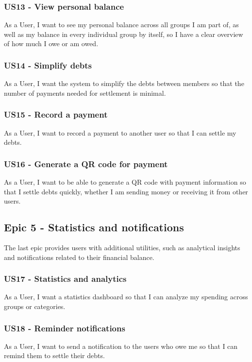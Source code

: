 \documentclass{ctuthesis}
\begin{document}
\subsubsection{US13 - View personal balance}
As a User, I want to see my personal balance across all groups I am part of, as well as my balance in every individual group by itself, so I have a clear overview of how much I owe or am owed.

\subsubsection{US14 - Simplify debts}
As a User, I want the system to simplify the debts between members so that the number of payments needed for settlement is minimal.

\subsubsection{US15 - Record a payment}
As a User, I want to record a payment to another user so that I can settle my debts.

\subsubsection{US16 - Generate a QR code for payment}
As a User, I want to be able to generate a QR code with payment information so that I settle debts quickly, whether I am sending money or receiving it from other users.

\subsection{Epic 5 - Statistics and notifications}
The last epic provides users with additional utilities, such as analytical insights and notifications related to their financial balance.
\subsubsection{US17 - Statistics and analytics}
As a User, I want a statistics dashboard so that I can analyze my spending across groups or categories. 

\subsubsection{US18 - Reminder notifications}
As a User, I want to send a notification to the users who owe me so that I can remind them to settle their debts.
\end{document}
